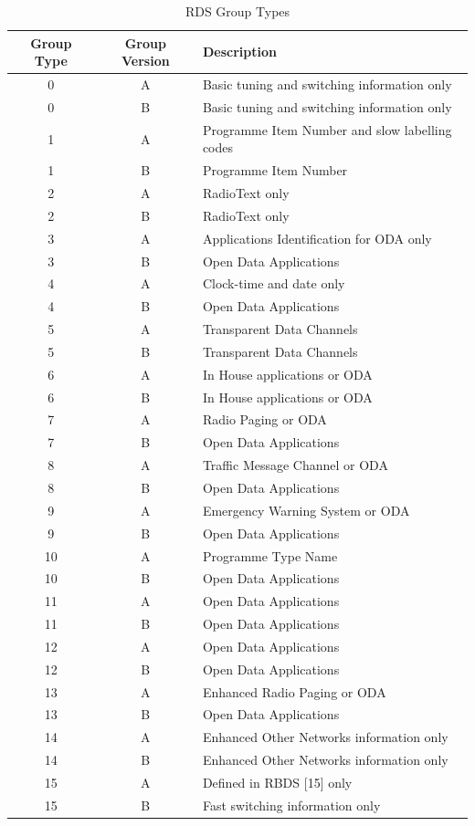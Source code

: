\begin{table}
	\begin{center}
		\begin{tabular}{ c c l }
		 Group Type & Group Version & Description \\\hline
		 0 & A & Basic tuning and switching information only \\
		 0 & B & Basic tuning and switching information only \\
		 1 & A & Programme Item Number and slow labelling codes\\
		 1 & B & Programme Item Number \\
		 2 & A & RadioText only \\
		 2 & B & RadioText only \\
		 3 & A & Applications Identification for ODA only \\
		 3 & B & Open Data Applications\\
		 4 & A & Clock-time and date only \\
		 4 & B & Open Data Applications\\
		 5 & A & Transparent Data Channels \\
		 5 & B & Transparent Data Channels \\
		 6 & A & In House applications or ODA \\
		 6 & B & In House applications or ODA \\
		 7 & A & Radio Paging or ODA \\
		 7 & B & Open Data Applications\\
		 8 & A & Traffic Message Channel or ODA \\
		 8 & B & Open Data Applications\\
		 9 & A & Emergency Warning System or ODA \\
		 9 & B & Open Data Applications\\
		10 & A & Programme Type Name\\
		10 & B & Open Data Applications\\
		11 & A & Open Data Applications\\
		11 & B & Open Data Applications\\
		12 & A & Open Data Applications\\
		12 & B & Open Data Applications\\
		13 & A & Enhanced Radio Paging or ODA\\
		13 & B & Open Data Applications\\
		14 & A & Enhanced Other Networks information only \\
		14 & B & Enhanced Other Networks information only \\
		15 & A & Defined in RBDS [15] only\\
		15 & B & Fast switching information only \\\hline
		\end{tabular}
		\caption{RDS Group Types}
		\label{tab:rds_groups}
	\end{center}
\end{table}

